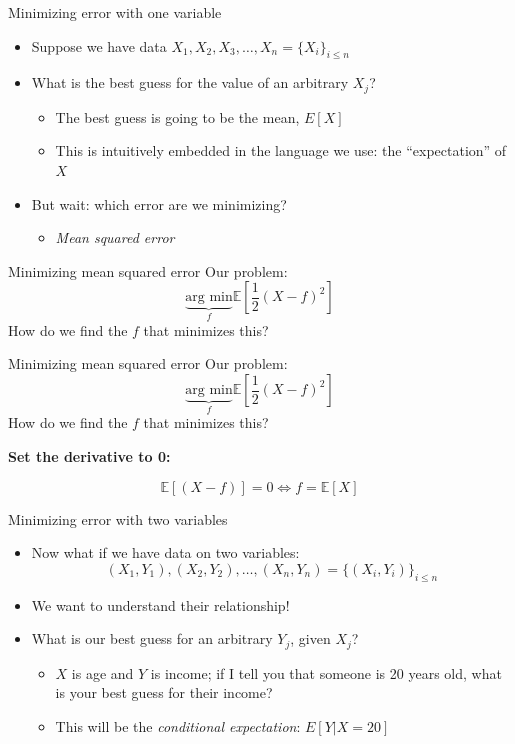 \documentclass[aspectratio=169]{beamer}
\begin{document}
\begin{frame}{Minimizing error with one variable}
    \begin{itemize}
        \item Suppose we have data $X_1, X_2, X_3, \ldots, X_n = \{ X_i \}_{i \leq n} $
        \item What is the best guess for the value of an arbitrary $X_j$?
        \begin{itemize}
            \item The best guess is going to be the mean, $ E[X] $
            \item This is intuitively embedded in the language we use: the ``expectation'' of $X$
        \end{itemize}
        \item But wait: which error are we minimizing?
        \begin{itemize}
            \item \textit{Mean squared error}
        \end{itemize}
    \end{itemize}
\end{frame}

\begin{frame}{Minimizing mean squared error}
   Our problem:
   $$
    \underbrace{\text{arg min}}_{f} \mathbb{E}\left[\frac{1}{2}(X - f)^2\right]
   $$
   How do we find the $f$ that minimizes this?
\end{frame}

\begin{frame}{Minimizing mean squared error}
    Our problem:
    $$
    \underbrace{\text{arg min}}_{f} \mathbb{E}\left[\frac{1}{2}(X - f)^2\right]
    $$
    How do we find the $f$ that minimizes this? 

    \vspace{2mm}

    \textbf{Set the derivative to 0:}

    $$
    \mathbb{E}[(X-f)] = 0 \iff f = \mathbb{E}[X]
    $$
 \end{frame}

\begin{frame}{Minimizing error with two variables}
    \begin{itemize}
        \item Now what if we have data on two variables:
        $$
        (X_1, Y_1), (X_2, Y_2), \ldots, (X_n, Y_n) = \{ (X_i, Y_i) \}_{i \leq n}
        $$
        \item We want to understand their relationship! 
        \item What is our best guess for an arbitrary $Y_j$, given $X_j$?
        \begin{itemize}
            \item $X$ is age and $Y$ is income; if I tell you that someone is 20 years old, what is your best guess for their income?
            \item This will be the \textit{conditional expectation}: $E[Y|X=20]$
        \end{itemize}
    \end{itemize}
\end{frame}
\end{document}
